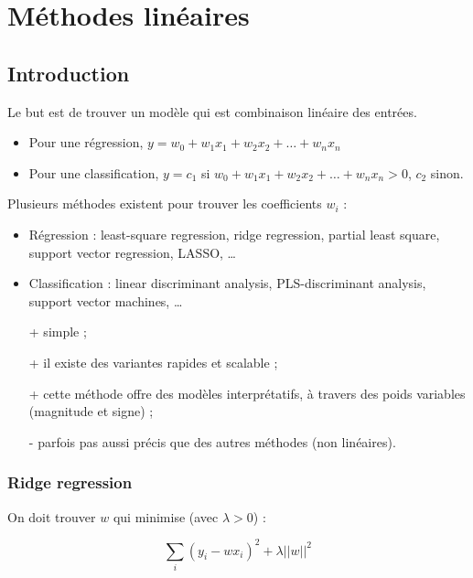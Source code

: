 \chapter{Méthodes linéaires}

	\section{Introduction}
	Le but est de trouver un modèle qui est combinaison linéaire des entrées.

	\begin{itemize}
		\item Pour une régression, $y = w_0 + w_1 x_1 + w_2 x_2 + \dots + w_n x_n$
		\item Pour une classification, $y = c_1$ si $w_0 + w_1 x_1 + w_2 x_2 + \dots + w_n x_n > 0$, $c_2$ sinon.
	\end{itemize}


	Plusieurs méthodes existent pour trouver les coefficients $w_i$ : 

	\begin{itemize}
		\item Régression : least-square regression, ridge regression, partial least square, support vector regression, LASSO, \dots
		\item Classification : linear discriminant analysis, PLS-discriminant analysis, support vector machines, \dots \\
	\end{itemize} 

	\begin{itemize}
		\item[+] simple ;
		\item[+] il existe des variantes rapides et scalable ;
		\item[+] cette méthode offre des modèles interprétatifs, à travers des poids variables (magnitude et signe) ;
		\item[-] parfois pas aussi précis que des autres méthodes (non linéaires).
	\end{itemize}

		\subsection{Ridge regression}
	
		On doit trouver $w$ qui minimise (avec $\lambda > 0$) :
	
		$$\sum_i (y_i - wx_i)^2 + \lambda \vert \vert w \vert \vert^2$$
	
